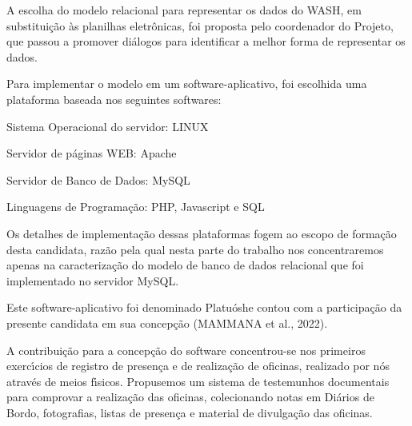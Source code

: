 \documentclass[
12pt,		%
openright,	%
twoside,  %
a4paper,			%
chapter=TITLE,		%
english,			%
french,				%
spanish,			%
brazil				%
]{USPSC-classe/USPSC}
\begin{document}
A escolha do modelo relacional para representar os dados do WASH, em substitui\c{c}\~ao \`as planilhas eletr\^onicas, foi proposta pelo coordenador do Projeto, que passou a promover di\'alogos para identificar a melhor forma de representar os dados.














Para implementar o modelo em um software-aplicativo, foi escolhida uma plataforma baseada nos seguintes softwares:















\begin{alineas}
\item Sistema Operacional do servidor: LINUX
\item Servidor de p\'aginas WEB: Apache
\item Servidor de Banco de Dados: MySQL
\item Linguagens de Programa\c{c}\~ao: PHP, Javascript e SQL
\end{alineas}

Os detalhes de implementa\c{c}\~ao dessas plataformas fogem ao escopo de forma\c{c}\~ao desta candidata, raz\~ao pela qual nesta parte do trabalho nos concentraremos apenas na caracteriza\c{c}\~ao do modelo de banco de dados relacional que foi implementado no servidor MySQL.














Este software-aplicativo foi denominado \textquotedbl Platu\'osh\textquotedbl  e contou com a participa\c{c}\~ao da presente candidata em sua concep\c{c}\~ao  (MAMMANA et al., 2022).














A contribui\c{c}\~ao para a concep\c{c}\~ao do software concentrou-se nos primeiros exerc\'{\i}cios de registro de presen\c{c}a e de realiza\c{c}\~ao de oficinas, realizado por n\'os atrav\'es de meios f\'{\i}sicos. Propusemos um sistema de testemunhos documentais para comprovar a realiza\c{c}\~ao das oficinas, colecionando notas em Di\'arios de Bordo, fotografias, listas de presen\c{c}a e material de divulga\c{c}\~ao das oficinas.
\end{document}
